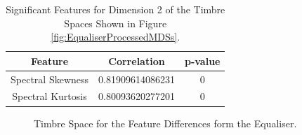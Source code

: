 	\begin{table}[h!]
		\centering
		\begin{tabular}{|c|c|c|}
			\hline
			\bf{Feature} & \bf{Correlation} & \bf{p-value} \\
			\hline
			\hline
			Spectral Skewness & 0.81909614086231 & 0 \\
			\hline
			Spectral Kurtosis & 0.80093620277201 & 0 \\
			\hline
		\end{tabular}
		\caption{Significant Features for Dimension 2 of the Timbre Spaces Shown in Figure 
			 \ref{fig:EqualiserProcessedMDSs}.}
		\label{tab:EqualiserProcessedFeaturesDim2}
	\end{table}

	\begin{figure}[h!]
		\centering
		\qquad
		\caption{Timbre Space for the Feature Differences form the Equaliser.}
		\label{fig:EqualiserDifferenceMDSs}
	\end{figure}

